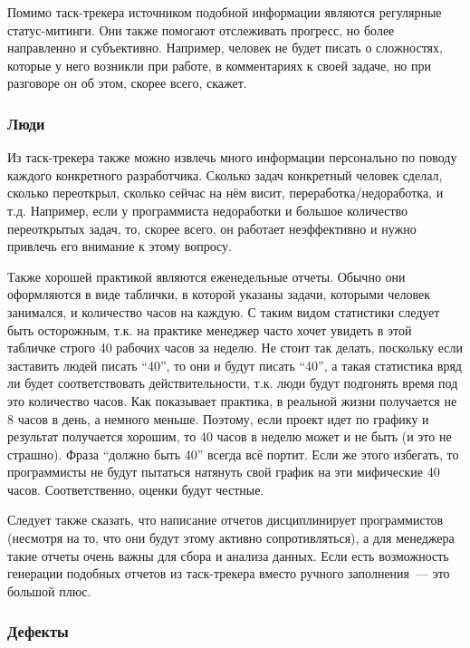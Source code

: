 \documentclass{../../text-style}
\begin{document}
Помимо таск-трекера источником подобной информации являются регулярные статус-митинги. Они также помогают отслеживать прогресс, но более направленно и субъективно. Например, человек не будет писать о сложностях, которые у него возникли при работе, в комментариях к своей задаче, но при разговоре он об этом, скорее всего, скажет.

\subsubsection{Люди}

Из таск-трекера также можно извлечь много информации персонально по поводу каждого конкретного разработчика. Сколько задач конкретный человек сделал, сколько переоткрыл, сколько сейчас на нём висит, переработка/недоработка, и т.д. Например, если у программиста недоработки и большое количество переоткрытых задач, то, скорее всего, он работает неэффективно и нужно привлечь его внимание к этому вопросу.

Также хорошей практикой являются еженедельные отчеты. Обычно они оформляются в виде таблички, в которой указаны задачи, которыми человек занимался, и количество часов на каждую. С таким видом статистики следует быть осторожным, т.к. на практике менеджер часто хочет увидеть в этой табличке строго 40 рабочих часов за неделю. Не стоит так делать, поскольку если заставить людей писать \enquote{40}, то они и будут писать \enquote{40}, а такая статистика вряд ли будет соответствовать действительности, т.к. люди будут подгонять время под это количество часов. Как показывает практика, в реальной жизни получается не 8 часов в день, а немного меньше. Поэтому, если проект идет по графику и результат получается хорошим, то 40 часов в неделю может и не быть (и это не страшно). Фраза \enquote{должно быть 40} всегда всё портит. Если же этого избегать, то программисты не будут пытаться натянуть свой график на эти мифические 40 часов. Соответственно, оценки будут честные.

Следует также сказать, что написание отчетов дисциплинирует программистов (несмотря на то, что они будут этому активно сопротивляться), а для менеджера такие отчеты очень важны для сбора и анализа данных. Если есть возможность генерации подобных отчетов из таск-трекера вместо ручного заполнения~--- это большой плюс.

\subsubsection{Дефекты}
\end{document}
